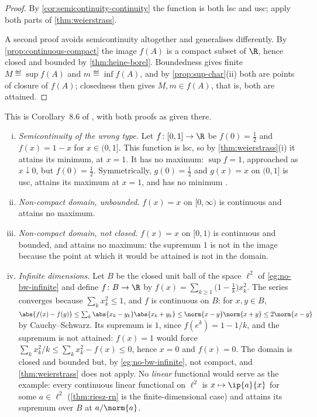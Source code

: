 \begin{proof}
	By \autoref{cor:semicontinuity-continuity} the function is both lsc and usc;
	apply both parts of \autoref{thm:weierstrass}.

	A second proof avoids semicontinuity altogether and generalises differently. By \autoref{prop:continuous-compact} the image $f(A)$
	is a compact subset of $\R$, hence closed and bounded by
	\autoref{thm:heine-borel}. Boundedness gives finite
	$M\eqdef\sup f(A)$ and $m\eqdef\inf f(A)$, and by
	\autoref{prop:sup-char}(ii) both are points of closure of $f(A)$; closedness
	then gives $M,m\in f(A)$, that is, both are attained.
\end{proof}

This is Corollary~8.6 of \textcite[p.~275]{fukuda2026notes}, with both proofs as
given there.

\begin{eg}\label{eg:weierstrass-failures}
	\begin{enumerate}[(i)]
		\item \emph{Semicontinuity of the wrong type.} Let $f\colon[0,1]\to\R$ be
		      $f(0)=\tfrac12$ and $f(x)=1-x$ for $x\in(0,1]$. This function is lsc, so
		      by \autoref{thm:weierstrass}(i) it attains its minimum, at $x=1$. It has
		      no maximum: $\sup f=1$, approached as $x\downarrow0$, but $f(0)=\tfrac12$.
		      Symmetrically, $g(0)=\tfrac12$ and $g(x)=x$ on $(0,1]$ is usc, attains its
		      maximum at $x=1$, and has no minimum \autocite[Ex.~8.5,
			      p.~274]{fukuda2026notes}.
		\item \emph{Non-compact domain, unbounded.} $f(x)=x$ on $[0,\infty)$ is
		      continuous and attains no maximum.
		\item \emph{Non-compact domain, not closed.} $f(x)=x$ on $[0,1)$ is continuous
		      and bounded, and attains no maximum: the supremum $1$ is not in the image
		      because the point at which it would be attained is not in the domain.
		\item \emph{Infinite dimensions.} Let $B$ be the closed unit ball of the
		      space $\ell^2$ of \autoref{eg:no-bw-infinite} and define
		      $f\colon B\to\R$ by
		      $f(x)=\sum_{k\geq1}\bigl(1-\tfrac1k\bigr)x_k^2$. The series converges
		      because $\sum_kx_k^2\leq1$, and $f$ is continuous on $B$: for
		      $x,y\in B$,
		      $\abs{f(x)-f(y)}\leq\sum_k\abs{x_k-y_k}\abs{x_k+y_k}
			      \leq\norm{x-y}\norm{x+y}\leq2\norm{x-y}$ by Cauchy--Schwarz. Its
		      supremum is $1$, since $f(e^k)=1-1/k$, and the supremum is not attained:
		      $f(x)=1$ would force $\sum_kx_k^2/k\leq\sum_kx_k^2-f(x)\leq0$, hence
		      $x=0$ and $f(x)=0$. The domain is closed and bounded but, by
		      \autoref{eg:no-bw-infinite}, not compact, and
		      \autoref{thm:weierstrass} does not apply. No \emph{linear} functional
		      would serve as the example: every continuous linear functional on
		      $\ell^2$ is $x\mapsto\ip{a}{x}$ for some $a\in\ell^2$
		      (\autoref{thm:riesz-rn} is the finite-dimensional case) and attains its
		      supremum over $B$ at $a/\norm{a}$.
	\end{enumerate}
\end{eg}

